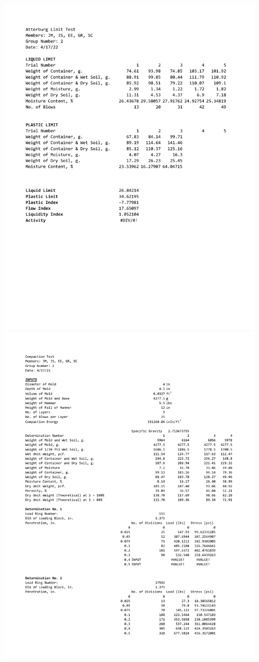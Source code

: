 \documentclass{article}
\begin{document}
\begin{center}
\includegraphics*[scale=0.8]{ds3.pdf}
\includegraphics*[scale=0.8]{ds4.pdf}
\end{center}
\end{document}
